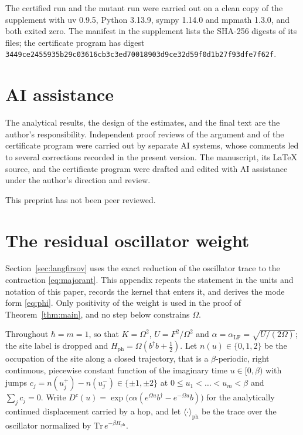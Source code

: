 \documentclass[11pt]{article}
\theoremstyle{plain}
\theoremstyle{definition}
\begin{document}
The certified run and the mutant run were carried out on a clean copy of the
supplement with uv 0.9.5, Python 3.13.9, sympy 1.14.0 and mpmath 1.3.0, and both
exited zero. The manifest in the supplement lists the SHA-256 digests of its files;
the certificate program has digest
\texttt{3449ce2455935b29c03616cb3c3ed70018903d9ce32d59f0d1b27f93dfe7f62f}.

\section*{AI assistance}

The analytical results, the design of the estimates, and the final text are the
author's responsibility. Independent proof reviews of the argument and of the
certificate program were carried out by separate AI systems, whose comments led to
several corrections recorded in the present version. The manuscript, its LaTeX
source, and the certificate program were drafted and edited with AI assistance under
the author's direction and review.

This preprint has not been peer reviewed.

\appendix

\section{The residual oscillator weight}\label{app:oscillator}

Section~\ref{sec:langfirsov} uses the exact reduction of the oscillator trace to the
contraction \eqref{eq:majorant}. This appendix repeats the statement in the units and
notation of this paper, records the kernel that enters it, and derives the mode form
\eqref{eq:phi}. Only positivity of the weight is used in the proof of
Theorem~\ref{thm:main}, and no step below constrains $\Omega$.

Throughout $\hbar=m=1$, so that $K=\Omega^{2}$, $U=F^{2}/\Omega^{2}$ and
$\alpha=\alpha_{\mathrm{LF}}=\sqrt{U/(2\Omega)}$; the site label is dropped and
$H_{\mathrm{ph}}=\Omega(b^{\dagger}b+\tfrac12)$. Let $n(u)\in\{0,1,2\}$ be the
occupation of the site along a closed trajectory, that is a $\beta$-periodic,
right continuous, piecewise constant function of the imaginary time
$u\in[0,\beta)$ with jumps $c_j=n(u_j^{+})-n(u_j^{-})\in\{\pm1,\pm2\}$ at
$0\le u_1<\dots<u_m<\beta$ and $\sum_jc_j=0$. Write
$D^{c}(u)=\exp\bigl(c\alpha(e^{\Omega u}b^{\dagger}-e^{-\Omega u}b)\bigr)$ for the
analytically continued displacement carried by a hop, and let
$\langle\cdot\rangle_{\mathrm{ph}}$ be the trace over the oscillator normalized by
$\mathrm{Tr}\,e^{-\beta H_{\mathrm{ph}}}$.
\end{document}

